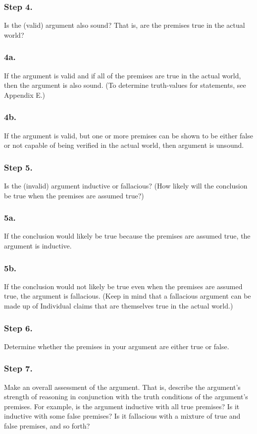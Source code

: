 \documentclass{article}
\begin{document}
\subsubsection{Step 4.}
Is the (valid) argument also sound?
 That is, are the premises true in the actual world?

\subsubsection{4a.}
If the argument is valid and if all of the premises are true in the actual world, then the argument is also sound.
(To determine truth-values for statements, see Appendix E.)

\subsubsection{4b.}
If the argument is valid, but one or more premises can be shown to be either false or not capable of being verified in the actual world, then argument is unsound.

\subsubsection{Step 5.}
Is the (invalid) argument inductive or fallacious? (How likely will the conclusion be true when the premises are assumed true?)

\subsubsection{5a.}
If the conclusion would likely be true because the premises are assumed true, the argument is inductive.

\subsubsection{5b.}
If the conclusion would not likely be true even when the premises are assumed true, the argument is fallacious.
(Keep in mind that a fallacious argument can be made up of Individual claims that are themselves true in the actual world.)

\subsubsection{Step 6.}
Determine whether the premises in your argument are either true or false.

\subsubsection{Step 7.}
Make an overall assessment of the argument.
That is, describe the argument's strength of reasoning in conjunction with the truth conditions of the argument's premises.
For example, is the argument inductive with all true premises?
Is it inductive with some false premises?
Is it fallacious with a mixture of true and false premises, and so forth?
\end{document}
